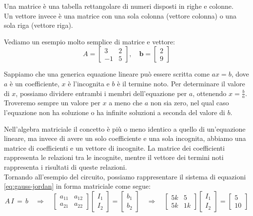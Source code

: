 Una matrice è una tabella rettangolare di numeri disposti in righe e colonne.\\
Un vettore invece è una matrice con una sola colonna (vettore colonna) o una sola riga (vettore riga).

Vediamo un esempio molto semplice di matrice e vettore:
\begin{equation}
	A = \begin{bmatrix}
	3 & 2 \\
	-1 & 5
	\end{bmatrix}, \quad
	\mathbf{b} = \begin{bmatrix}
	2 \\
	9
	\end{bmatrix}
	\label{eq: generic Matrix and Vector}
\end{equation}

Sappiamo che una generica equazione lineare può essere scritta come $ax = b$, dove $a$ è un coefficiente, $x$ è l’incognita e $b$ è il termine noto. Per determinare il valore di $x$, possiamo dividere entrambi i membri dell’equazione per $a$, ottenendo $x = \frac{b}{a}$. Troveremo sempre un valore per $x$ a meno che $a$ non sia zero, nel qual caso l’equazione non ha soluzione o ha infinite soluzioni a seconda del valore di $b$.

Nell'algebra matriciale il concetto è più o meno identico a quello di un'equazione lineare, ma invece di avere un solo coefficiente e una sola incognita, abbiamo una matrice di coefficienti e un vettore di incognite. La matrice dei coefficienti rappresenta le relazioni tra le incognite, mentre il vettore dei termini noti rappresenta i risultati di queste relazioni. \\

Tornando all'esempio del circuito, possiamo rappresentare il sistema di equazioni \eqref{eq:gauss-jordan} in forma matriciale come segue:
\begin{equation}
A\, I \,= \,b \quad \Rightarrow \quad
\begin{bmatrix}
a_{11} & a_{12} \\
a_{21} & a_{22}
\end{bmatrix}
\begin{bmatrix}
I_1 \\
I_2
\end{bmatrix}
=
\begin{bmatrix}
b_1 \\
b_2
\end{bmatrix}
\quad \Rightarrow \quad
\begin{bmatrix}
5k & 5 \\
5k & 1k
\end{bmatrix}
\begin{bmatrix}
I_1 \\
I_2
\end{bmatrix}
=
\begin{bmatrix}
5 \\
10
\end{bmatrix}
\end{equation}

